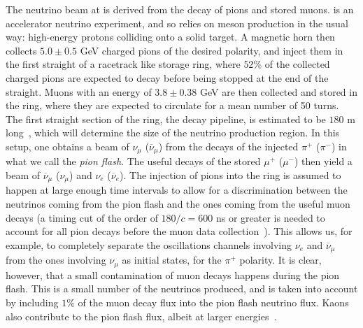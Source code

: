 The neutrino beam at \nus is derived from the decay of pions and stored muons. \nus is an accelerator neutrino experiment, and so relies on meson production in the usual way: high-energy protons colliding onto a solid target. A magnetic horn then collects $5.0 \pm 0.5$ GeV charged pions of the desired polarity, and inject them in the first straight of a racetrack like storage ring, where $52$\% of the collected charged pions are expected to decay before being stopped at the end of the straight. Muons with an energy of $3.8 \pm 0.38$ GeV are then collected and stored in the ring, where they are expected to circulate for a mean number of 50 turns. The first straight section of the ring, the decay pipeline, is estimated to be $180$ m long~\cite{Neuffer2015}, which will determine the size of the neutrino production region. 
In this setup, one obtains a beam of  $\nu_{\mu}$ ($\overline{\nu}_{\mu}$) from the decays of the injected $\pi^+$ ($\pi^-$) in what we call the \emph{pion flash}. The useful decays of the stored $\mu^+$ ($\mu^-$) then yield a beam of $\overline{\nu}_{\mu}$ ($\nu_{\mu}$) and $\nu_e$ ($\overline{\nu}_{e}$). The injection of pions into the ring is assumed to happen at large enough time intervals to allow for a discrimination between the neutrinos coming from the pion flash and the ones coming from the useful muon decays (a timing cut of the order of $180/c = 600$ ns or greater is needed to account for all pion decays before the muon data collection~\cite{Tunnell2013}). This allows us, for example, to completely separate the oscillations channels involving $\nu_{e}$ and $\overline{\nu}_{\mu}$ from the ones involving $\nu_{\mu}$ as initial states, for the $\pi^+$ polarity. It is clear, however, that a small contamination of muon decays happens during the pion flash. This is a small number of the neutrinos produced, and is taken into account by including $1\%$ of the muon decay flux into the pion flash neutrino flux. Kaons also contribute to the pion flash flux, albeit at larger energies~. 
%
